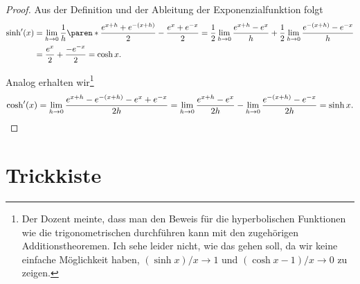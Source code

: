 \documentclass[a4paper]{article}
\begin{document}
\begin{proof}
    Aus der Definition und der Ableitung der Exponenzialfunktion folgt
    \begin{align*}
        \sinh'(x) & = \lim_{h\to0} \frac{1}{h} \paren*{\frac{e^{x+h}+e^{-(x+h)}}{2} - \frac{e^x+e^{-x}}{2}} = \frac{1}{2} \lim_{h\to0} \frac{e^{x+h}-e^x}{h} + \frac{1}{2} \lim_{h\to0} \frac{e^{-(x+h)}-e^{-x}}{h} \\
                  & = \frac{e^x}{2} + \frac{-e^{-x}}{2} = \cosh x.
    \end{align*}

    Analog erhalten wir\footnote{Der Dozent meinte, dass man den Beweis für die hyperbolischen Funktionen wie die trigonometrischen durchführen kann mit den zugehörigen Additionstheoremen. Ich sehe leider nicht, wie das gehen soll, da wir keine einfache Möglichkeit haben, $(\sinh x)/x \to 1$ und $(\cosh x-1)/x \to 0$ zu zeigen.}
    \begin{equation*}
        \cosh'(x) =  \lim_{h\to0} \frac{e^{x+h} - e^{-(x+h)} - e^x + e^{-x}}{2h} = \lim_{h\to0} \frac{e^{x+h}-e^x}{2h} - \lim_{h\to0} \frac{e^{-(x+h)}-e^{-x}}{2h} = \sinh x. \qedhere
    \end{equation*}
\end{proof}


\newpage\appendix

\section{Trickkiste}
\end{document}

